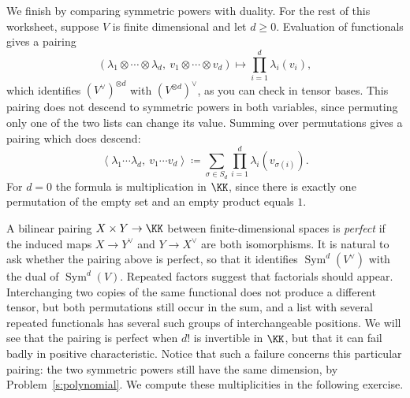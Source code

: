 \documentclass[12pt,reqno]{amsart}
\DeclareMathOperator{\Sym}{Sym}
\begin{document}
\hrulefill

We finish by comparing symmetric powers with duality. For the rest of this worksheet, suppose $V$ is finite dimensional and let $d\geq0$. Evaluation of functionals gives a pairing
\[
(\lambda_1\otimes\cdots\otimes\lambda_d,\ v_1\otimes\cdots\otimes v_d)\longmapsto\prod_{i=1}^d\lambda_i(v_i),
\]
which identifies $(V^{\vee})^{\otimes d}$ with $(V^{\otimes d})^{\vee}$, as you can check in tensor bases. This pairing does not descend to symmetric powers in both variables, since permuting only one of the two lists can change its value. Summing over permutations gives a pairing which does descend:
\[
\left\langle\lambda_1\cdots\lambda_d,\ v_1\cdots v_d\right\rangle\coloneqq\sum_{\sigma\in S_d}\prod_{i=1}^d\lambda_i(v_{\sigma(i)}).
\]
For $d=0$ the formula is multiplication in $\KK$, since there is exactly one permutation of the empty set and an empty product equals $1$.

A bilinear pairing $X\times Y\to\KK$ between finite-dimensional spaces is \emph{perfect} if the induced maps $X\to Y^{\vee}$ and $Y\to X^{\vee}$ are both isomorphisms. It is natural to ask whether the pairing above is perfect, so that it identifies $\Sym^d(V^{\vee})$ with the dual of $\Sym^d(V)$. Repeated factors suggest that factorials should appear. Interchanging two copies of the same functional does not produce a different tensor, but both permutations still occur in the sum, and a list with several repeated functionals has several such groups of interchangeable positions. We will see that the pairing is perfect when $d!$ is invertible in $\KK$, but that it can fail badly in positive characteristic. Notice that such a failure concerns this particular pairing: the two symmetric powers still have the same dimension, by Problem~\ref{s:polynomial}. We compute these multiplicities in the following exercise.

\hrulefill
\end{document}
